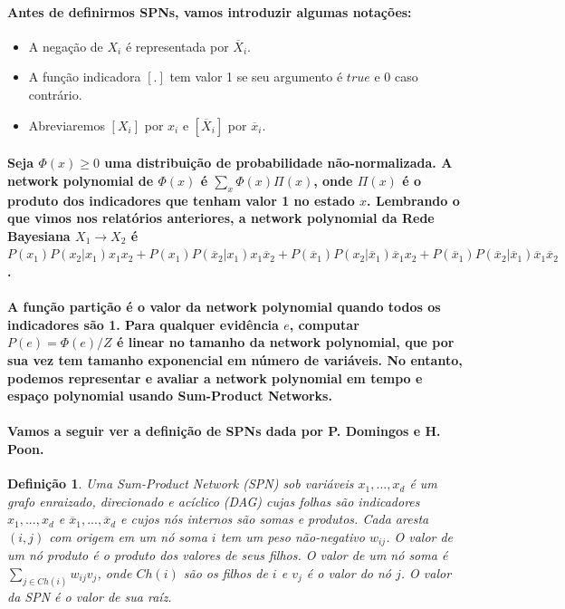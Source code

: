 \documentclass[a4paper,10pt]{article}
\theoremstyle{plain}
\newtheorem{spn-def}{Definição}
\begin{document}
\paragraph{
  Antes de definirmos SPNs, vamos introduzir algumas notações:
}

\begin{itemize}
  \item A negação de $X_i$ é representada por $\overline{X}_i$.
  \item A função indicadora\cite{report-1} $[.]$ tem valor 1 se seu argumento é $true$ e 0 caso
    contrário.
  \item Abreviaremos $[X_i]$ por $x_i$ e $[\overline{X}_i]$ por $\overline{x}_i$.
\end{itemize}

\paragraph{
  Seja $\Phi(x) \geq 0$ uma distribuição de probabilidade não-normalizada. A network polynomial
  \cite{report-1} de $\Phi(x)$ é $\sum_x \Phi(x) \Pi (x)$, onde $\Pi(x)$ é o produto dos
  indicadores que tenham valor 1 no estado $x$. Lembrando o que vimos nos relatórios anteriores,
  a network polynomial da Rede Bayesiana $X_1 \to X_2$ é $P(x_1)P(x_2|x_1)x_1x_2+P(x_1)
  P(\overline{x}_2|x_1)x_1\overline{x}_2+P(\overline{x}_1)P(x_2|\overline{x}_1)\overline{x}_1x_2+
  P(\overline{x}_1)P(\overline{x}_2|\overline{x}_1)\overline{x}_1\overline{x}_2$.
}

\paragraph{
  A função partição é o valor da network polynomial quando todos os indicadores são 1. Para
  qualquer evidência $e$, computar $P(e)=\Phi(e)/Z$ é linear no tamanho da network polynomial, que
  por sua vez tem tamanho exponencial em número de variáveis. No entanto, podemos representar e
  avaliar a network polynomial em tempo e espaço polynomial usando Sum-Product Networks.
}

\paragraph{
  Vamos a seguir ver a definição de SPNs dada por P. Domingos e H. Poon\cite{poon-domingos}.
}

\begin{spn-def} Uma Sum-Product Network (SPN) sob variáveis $x_1,...,x_d$ é um grafo enraizado,
  direcionado e acíclico (DAG) cujas folhas são indicadores $x_1,...,x_d$ e $\overline{x}_1,...,
  \overline{x}_d$ e cujos nós internos são somas e produtos. Cada aresta $(i,j)$ com origem em um
  nó soma $i$ tem um peso não-negativo $w_{ij}$. O valor de um nó produto é o produto dos valores
  de seus filhos. O valor de um nó soma é $\sum_{j \in Ch(i)} w_{ij}v_j$, onde $Ch(i)$ são os
  filhos de $i$ e $v_j$ é o valor do nó $j$. O valor da SPN é o valor de sua raíz.
\end{spn-def}
\end{document}
